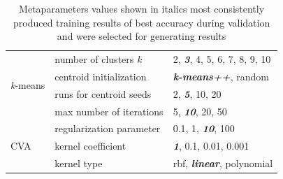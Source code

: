 \documentclass[12pt]{article}
\begin{document}
\begin{table}
\begin{center}
\begin{tabular}{l|l|l}
  \hline
  \multirow{4}{*}{\textit{k}-means} & number of clusters \textit{k}  & 2, \textit{\textbf{3}}, 4, 5, 6, 7, 8, 9, 10 \\
                                    & centroid initialization         & \textit{\textbf{k-means++}}, random \\
                                    & runs for centroid seeds	     & 2, \textit{\textbf{5}}, 10, 20 \\
                                    & max number of iterations           & 5, \textit{\textbf{10}}, 20, 50 \\
  \hline
    \multirow{3}{*}{CVA}            & regularization parameter  & 0.1, 1, \textit{\textbf{10}}, 100 \\
                                    & kernel coefficient      & \textit{\textbf{1}}, 0.1, 0.01, 0.001 \\
                                    & kernel type                  & rbf, \textit{\textbf{linear}}, polynomial \\
  \hline
  \end{tabular}
  \vspace{-2\baselineskip} %
  \end{center} 
  \caption{\centering\linespread{0.8}\selectfont Metaparameters values shown in italics most consistently produced training results of 
  best accuracy during validation and were selected for generating results}
  \vspace{-1\baselineskip} %
  \label{tab:metaparameters}
\end{table} 
\end{document}
